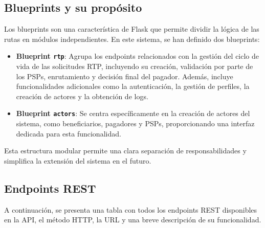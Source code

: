 \subsection{Blueprints y su propósito}

Los blueprints son una característica de Flask que permite dividir la lógica de las rutas en módulos independientes. En este sistema, se han definido dos blueprints:

\begin{itemize}
    \item \textbf{Blueprint \texttt{rtp}}: Agrupa los endpoints relacionados con la gestión del ciclo de vida de las solicitudes RTP, incluyendo su creación, validación por parte de los PSPs, enrutamiento y decisión final del pagador. Además, incluye funcionalidades adicionales como la autenticación, la gestión de perfiles, la creación de actores y la obtención de logs.
    \item \textbf{Blueprint \texttt{actors}}: Se centra específicamente en la creación de actores del sistema, como beneficiarios, pagadores y PSPs, proporcionando una interfaz dedicada para esta funcionalidad.
\end{itemize}

Esta estructura modular permite una clara separación de responsabilidades y simplifica la extensión del sistema en el futuro.

\subsection{Endpoints REST}

A continuación, se presenta una tabla con todos los endpoints REST disponibles en la API, el método HTTP, la URL y una breve descripción de su funcionalidad.

